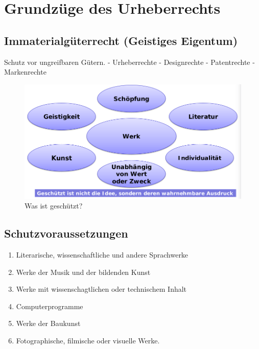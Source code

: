 \hypertarget{grundzuxfcge-des-urheberrechts}{%
\section{Grundzüge des
Urheberrechts}\label{grundzuxfcge-des-urheberrechts}}

\hypertarget{immaterialguxfcterrecht-geistiges-eigentum}{%
\subsection{Immaterialgüterrecht (Geistiges
Eigentum)}\label{immaterialguxfcterrecht-geistiges-eigentum}}

Schutz vor ungreifbaren Gütern. - Urheberrechte - Designrechte -
Patentrechte - Markenrechte

\begin{figure}
\centering
\includegraphics{figures/urheberrechtsSchutz.png}
\caption{Was ist geschützt?}
\end{figure}

\hypertarget{schutzvoraussetzungen}{%
\subsection{Schutzvoraussetzungen}\label{schutzvoraussetzungen}}

\begin{enumerate}
\def\labelenumi{\arabic{enumi}.}
\tightlist
\item
  Literarische, wissenschaftliche und andere Sprachwerke
\item
  Werke der Musik und der bildenden Kunst
\item
  Werke mit wissenschagtlichen oder technischem Inhalt
\item
  Computerprogramme
\item
  Werke der Baukunst
\item
  Fotographische, filmische oder visuelle Werke.
\end{enumerate}


